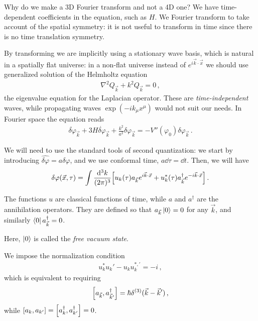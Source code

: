 \documentclass[main.tex]{subfiles}
\begin{document}
Why do we make a 3D Fourier transform and not a 4D one? We have time-dependent coefficients in the equation, such as \(H\). 
We Fourier transform to take account of the spatial symmetry: it is not useful to transform in time since there is no time translation symmetry. 

By transforming we are implicitly using a stationary wave basis, which is natural in a spatially flat universe: in a non-flat universe instead of \(e^{i \vec{k} \cdot \vec{x}}\) we should use generalized solution of the Helmholtz equation 
%
\begin{align}
\nabla^2 Q_{\vec{k}} + k^2 Q_{\vec{k}} = 0
\,,
\end{align}
%
the eigenvalue equation for the Laplacian operator. 
These are \emph{time-independent} waves, while propagating waves \(\exp(- i k_\mu x^{\mu })\) would not suit our needs. 
In Fourier space the equation reads 
%
\begin{align}
\ddot{ \delta \varphi} _{\vec{k}} + 3 H \dot{ \delta \varphi}_{\vec{k}}
+ \frac{k^2}{a^2} \delta \varphi _{\vec{k}} = - V'' (\varphi_0 ) \delta \varphi _{\vec{k}}
\,.
\end{align}

We will need to use the standard tools of second quantization: we start by introducing \(\hat{ \delta \varphi} = a \delta \varphi \), and we use conformal time, \(a \dd{ \tau } = \dd{t}\). Then, we will have 
%
\begin{align}
\delta \varphi (\vec{x}, \tau ) = \int \frac{ \dd[3]{k}}{(2 \pi)^3}
\qty[u_k (\tau ) a_{\vec{k}} e^{i \vec{k} \cdot \vec{x}} + u_k^{*} (\tau ) a_{\vec{k}}^\dag e^{-i \vec{k} \cdot \vec{x}}] 
\,.
\end{align}

The functions \(u\) are classical functions of time, while \(a\) and \(a ^\dag \) are the annihilation operators.
They are defined so that \(a_{\vec{k}} \ket{0} = 0\) for any \(\vec{k}\), and similarly \(\bra{0} a ^\dag_{\vec{k}} = 0\). 

Here, \(\ket{0}\) is called the \emph{free vacuum state}.

We impose the normalization condition 
%
\begin{align}
u_k^{*} u_k' - u_k u_k^{*, \prime} = -i
\,,
\end{align}
%
which is equivalent to requiring 
%
\begin{align}
\qty[a_{\vec{k}}, a_{\vec{k}'} ^\dag] = \hbar \delta^{(3)} (\vec{k} - \vec{k}')
\,,
\end{align}
%
while \(\qty[a_k, a_{k'}] = \qty[a_k ^\dag, a_{k'}^\dag] = 0\). 
\end{document}
